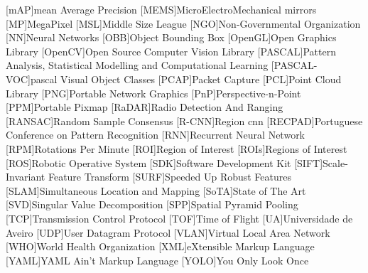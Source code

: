 \begin{multicols}{2}
\begin{acronym}[AAAAAA]
	[mAP]{mean Average Precision}
	[MEMS]{MicroElectroMechanical mirrors}
	[MP]{MegaPixel}
	[MSL]{Middle Size League}
	[NGO]{Non-Governmental Organization} 
	[NN]{Neural Networks}
	[OBB]{Object Bounding Box}
	[OpenGL]{Open Graphics Library}
	[OpenCV]{Open Source Computer Vision Library}
	[PASCAL]{Pattern Analysis, Statistical Modelling and Computational Learning} 
	[PASCAL-VOC]{\acl{pascal} Visual Object Classes}
	[PCAP]{Packet Capture}
	[PCL]{Point Cloud Library}
	[PNG]{Portable Network Graphics}
	[PnP]{Perspective-n-Point}
	[PPM]{Portable Pixmap}
	[RaDAR]{Radio Detection And Ranging}
	[RANSAC]{Random Sample Consensus}
	[R-CNN]{Region \acl{cnn}}
	[RECPAD]{Portuguese Conference on Pattern Recognition}
	[RNN]{Recurrent Neural Network}
	[RPM]{Rotations Per Minute}
	[ROI]{Region of Interest}
	[ROIs]{Regions of Interest}
	[ROS]{Robotic Operative System}
	[SDK]{Software Development Kit}
	[SIFT]{Scale-Invariant Feature Transform}
	[SURF]{Speeded Up Robust Features}
	[SLAM]{Simultaneous Location and Mapping} 
	[SoTA]{State of The Art}
	[SVD]{Singular Value Decomposition}
	[SPP]{Spatial Pyramid Pooling}
	[TCP]{Transmission Control Protocol}
	[TOF]{Time of Flight} 
	[UA]{Universidade de Aveiro}
	[UDP]{User Datagram Protocol}
	[VLAN]{Virtual Local Area Network}
	[WHO]{World Health Organization}
	[XML]{eXtensible Markup Language}
	[YAML]{YAML Ain't Markup Language}
	[YOLO]{You Only Look Once}
\end{acronym}
\end{multicols}

